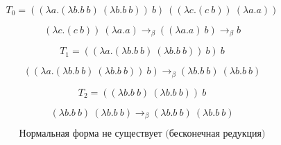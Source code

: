 \documentclass[12pt]{article}
\begin{document}
\[
T_0 = ((\lambda a. (\lambda b. b\ b)\ (\lambda b. b\ b))\ b)\ ((\lambda c. (c\ b))\ (\lambda a. a))
\]

\[
(\lambda c. (c\ b))\ (\lambda a. a) \rightarrow_\beta ((\lambda a. a)\ b) \rightarrow_\beta b
\]

\[
T_1 = ((\lambda a. (\lambda b. b\ b)\ (\lambda b. b\ b))\ b)\ b
\]

\[
((\lambda a. (\lambda b. b\ b)\ (\lambda b. b\ b))\ b) \rightarrow_\beta (\lambda b. b\ b)\ (\lambda b. b\ b)
\]

\[
T_2 = ((\lambda b. b\ b)\ (\lambda b. b\ b))\ b
\]

\[
(\lambda b. b\ b)\ (\lambda b. b\ b) \rightarrow_\beta (\lambda b. b\ b)\ (\lambda b. b\ b)
\]

\[
\text{Нормальная форма не существует (бесконечная редукция)}
\]
\end{document}
